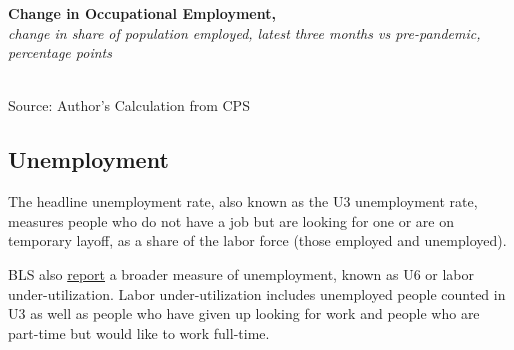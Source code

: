 \documentclass{report}
\newcommand{\tbllink}[1]{\href{https://raw.githubusercontent.com/bdecon/US-chartbook/master/chartbook/data/#1}{\faTable}}
\newcommand{\barylab}[2]{yticklabel style={text width=#1, align=right, 
		style={black!70}, text height=#2},}
\newcommand{\bbar}[2]{extra #1 ticks = {{#2}}, extra #1 tick labels = ,
		extra #1 tick style = {grid=major, grid style={thick, black!25}},}
\begin{document}
{{\begin{minipage}{0.76\textwidth}
\normalsize \textbf{Change in Occupational Employment, }\\
\footnotesize{\textit{change in share of population employed, latest three months vs pre-pandemic, percentage points}}\\
\hspace*{-9mm}  \\
\footnotesize{Source: Author's Calculation from CPS} \hfill \tbllink{occs.csv}
\end{minipage}
\newpage
\begin{minipage}{0.76\textwidth} 
\subsection*{\color{black!70} \seriffont Unemployment}
\small The headline unemployment rate, also known as the U3 unemployment rate, measures people who do not have a job but are looking for one or are on temporary layoff, as a share of the labor force (those employed and unemployed). 
\end{minipage}

\begin{minipage}{0.305\textwidth}
\small BLS also \href{https://www.bls.gov/news.release/empsit.t15.htm}{report} a broader measure of unemployment, known as U6 or labor under-utilization. Labor under-utilization includes unemployed people counted in U3 as well as people who have given up looking for work and people who are part-time but would like to work full-time. 


\end{minipage}}}
\end{document}
